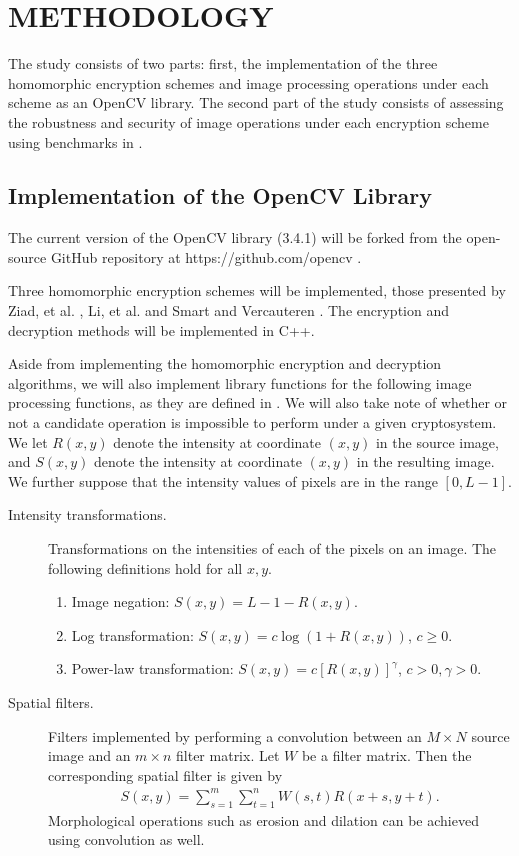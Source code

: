 \chapter{METHODOLOGY}

The study consists of two parts: first, the implementation of the three homomorphic encryption schemes and image processing operations under each scheme as an OpenCV library. The second part of the study consists of assessing the robustness and security of image operations under each encryption scheme using benchmarks in \cite{ahmed_benchmark_2016}.

\section{Implementation of the OpenCV Library}

The current version of the OpenCV library (3.4.1) will be forked from the open-source GitHub repository at https://github.com/opencv \cite{opencv_library}.

Three homomorphic encryption schemes will be implemented, those presented by Ziad, et al. \cite{ziad_cryptoimg:_2016}, Li, et al. \cite{li_elliptic_2012} and Smart and Vercauteren \cite{hutchison_fully_2010}. The encryption and decryption methods will be implemented in C++.

Aside from implementing the homomorphic encryption and decryption algorithms, we will also implement library functions for the following image processing functions, as they are defined in \cite{gonzalez_digital_2008}. We will also take note of whether or not a candidate operation is impossible to perform under a given cryptosystem.  We let $R(x,y)$ denote the intensity at coordinate $(x,y)$ in the source image, and $S(x,y)$ denote the intensity at coordinate $(x,y)$ in the resulting image. We further suppose that the intensity values of pixels are in the range $[0, L-1]$.
\begin{description}
	\item[Intensity transformations.] Transformations on the intensities of each of the pixels on an image. The following definitions hold for all $x,y$.
	\begin{enumerate}
		\item Image negation: $S(x,y) = L - 1 - R(x,y)$.
		\item Log transformation: $S(x,y) = c\log{(1 + R(x,y))}$, $c \geq 0$.
		\item Power-law transformation: $S(x,y) = c[R(x,y)]^\gamma$, $c > 0, \gamma > 0$.
	\end{enumerate}
	\item[Spatial filters.] Filters implemented by performing a convolution between an $M\times N$ source image and an $m\times n$ filter matrix. Let $W$ be a filter matrix. Then the corresponding spatial filter is given by
	\begin{align}
		S(x,y) = \sum_{s=1}^m{\sum_{t=1}^n{W(s,t)R(x+s,y+t)}}.
	\end{align}
	Morphological operations such as erosion and dilation can be achieved using convolution as well.
\end{description}

